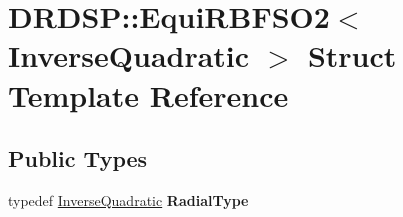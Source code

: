 \hypertarget{struct_d_r_d_s_p_1_1_equi_r_b_f_s_o2_3_01_inverse_quadratic_01_4}{\section{D\-R\-D\-S\-P\-:\-:Equi\-R\-B\-F\-S\-O2$<$ Inverse\-Quadratic $>$ Struct Template Reference}
\label{struct_d_r_d_s_p_1_1_equi_r_b_f_s_o2_3_01_inverse_quadratic_01_4}
}
\subsection*{Public Types}
\begin{DoxyCompactItemize}
\item 
\hypertarget{struct_d_r_d_s_p_1_1_equi_r_b_f_s_o2_3_01_inverse_quadratic_01_4_a10e12f81668783d7aea13cd71b999241}{typedef \hyperlink{struct_d_r_d_s_p_1_1_inverse_quadratic}{Inverse\-Quadratic} {\bfseries Radial\-Type}}\label{struct_d_r_d_s_p_1_1_equi_r_b_f_s_o2_3_01_inverse_quadratic_01_4_a10e12f81668783d7aea13cd71b999241}

\end{DoxyCompactItemize}
